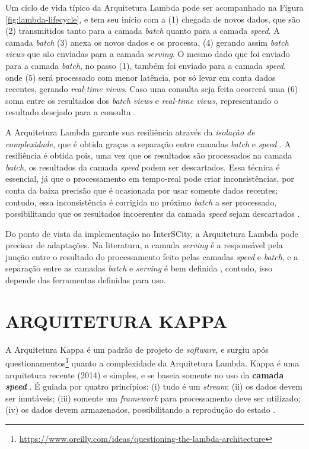 Um ciclo de vida típico da Arquitetura Lambda pode ser acompanhado na Figura
\ref{fig:lambda-lifecycle}, e tem seu início com a (1) chegada
de novos dados, que são (2) transmitidos tanto para a camada
\textit{batch} quanto para a camada \textit{speed}. A camada \textit{batch}
(3) anexa os novos dados e os processa, (4) gerando assim
\textit{batch views} que são enviadas para a camada \textit{serving}. O mesmo
dado que foi enviado para a camada \textit{batch}, no passo (1), também foi
enviado para a camada \textit{speed}, onde (5) será processado com menor latência,
por só levar em conta dados recentes, gerando \textit{real-time views}. 
Caso uma consulta seja feita ocorrerá uma (6) soma entre os resultados
dos \textit{batch views} e \textit{real-time views}, representando o resultado
desejado para a consulta \cite{marz2015}.

A Arquitetura Lambda garante sua resiliência através da \textit{isolação de
complexidade}, que é obtida graças a separação entre camadas \textit{batch}
e \textit{speed} \cite{marz2015}. A resiliência é obtida pois, uma vez que os
resultados são processados na camada \textit{batch}, os resultados da camada
\textit{speed} podem ser descartados. Essa técnica é essencial, já que o
processamento em tempo-real pode criar inconsistências, por conta da baixa
precisão que é ocasionada por usar somente dados recentes; contudo, essa
inconsistência é corrigida no próximo \textit{batch} a ser processado,
possibilitando que os resultados incoerentes da camada \textit{speed} sejam
descartados \cite{marz2015}.

Do ponto de vista da implementação no InterSCity, a Arquitetura Lambda pode
precisar de adaptações. Na literatura, a camada \textit{serving} é a responsável pela
junção entre o resultado do processamento feito pelas camadas \textit{speed} e
\textit{batch}, e a separação entre as camadas \textit{batch} e \textit{serving}
é bem definida \cite{marz2015}, contudo, isso depende das ferramentas
definidas para uso. 

\section{ARQUITETURA KAPPA}

A Arquitetura Kappa é um padrão de projeto de \textit{software}, e surgiu após
questionamentos\footnote{\url{https://www.oreilly.com/ideas/questioning-the-lambda-architecture}}
quanto a complexidade da Arquitetura Lambda. Kappa é uma arquitetura recente (2014) e
simples, e se baseia somente no uso da \textbf{camada \textit{speed}}
\cite{seyvet2016}. É guiada por quatro princípios: (i) tudo é um
\textit{stream}; (ii) os dados devem ser imutáveis; (iii) somente um
\textit{framework} para processamento deve ser utilizado; (iv) os dados devem
armazenados, possibilitando a reprodução do estado \cite{seyvet2016}.

